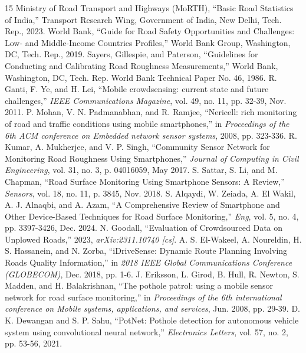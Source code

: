 \documentclass[conference]{IEEEtran}
\begin{document}
\begin{thebibliography}{15}
 Ministry of Road Transport and Highways (MoRTH), ``Basic Road Statistics of India,'' Transport Research Wing, Government of India, New Delhi, Tech. Rep., 2023.
 World Bank, ``Guide for Road Safety Opportunities and Challenges: Low- and Middle-Income Countries Profiles,'' World Bank Group, Washington, DC, Tech. Rep., 2019.
 Sayers, Gillespie, and Paterson, ``Guidelines for Conducting and Calibrating Road Roughness Measurements,'' World Bank, Washington, DC, Tech. Rep. World Bank Technical Paper No. 46, 1986.
 R. Ganti, F. Ye, and H. Lei, ``Mobile crowdsensing: current state and future challenges,'' \textit{IEEE Communications Magazine}, vol. 49, no. 11, pp. 32-39, Nov. 2011.
 P. Mohan, V. N. Padmanabhan, and R. Ramjee, ``Nericell: rich monitoring of road and traffic conditions using mobile smartphones,'' in \textit{Proceedings of the 6th ACM conference on Embedded network sensor systems}, 2008, pp. 323-336.
 R. Kumar, A. Mukherjee, and V. P. Singh, ``Community Sensor Network for Monitoring Road Roughness Using Smartphones,'' \textit{Journal of Computing in Civil Engineering}, vol. 31, no. 3, p. 04016059, May 2017.
 S. Sattar, S. Li, and M. Chapman, ``Road Surface Monitoring Using Smartphone Sensors: A Review,'' \textit{Sensors}, vol. 18, no. 11, p. 3845, Nov. 2018.
 S. Alqaydi, W. Zeiada, A. El Wakil, A. J. Alnaqbi, and A. Azam, ``A Comprehensive Review of Smartphone and Other Device-Based Techniques for Road Surface Monitoring,'' \textit{Eng}, vol. 5, no. 4, pp. 3397-3426, Dec. 2024.
 N. Goodall, ``Evaluation of Crowdsourced Data on Unplowed Roads,'' 2023, \textit{arXiv:2311.10740 [cs]}.
 A. S. El-Wakeel, A. Noureldin, H. S. Hassanein, and N. Zorba, ``iDriveSense: Dynamic Route Planning Involving Roads Quality Information,'' in \textit{2018 IEEE Global Communications Conference (GLOBECOM)}, Dec. 2018, pp. 1-6.
 J. Eriksson, L. Girod, B. Hull, R. Newton, S. Madden, and H. Balakrishnan, ``The pothole patrol: using a mobile sensor network for road surface monitoring,'' in \textit{Proceedings of the 6th international conference on Mobile systems, applications, and services}, Jun. 2008, pp. 29-39.
 D. K. Dewangan and S. P. Sahu, ``PotNet: Pothole detection for autonomous vehicle system using convolutional neural network,'' \textit{Electronics Letters}, vol. 57, no. 2, pp. 53-56, 2021.

\end{thebibliography}
\end{document}
